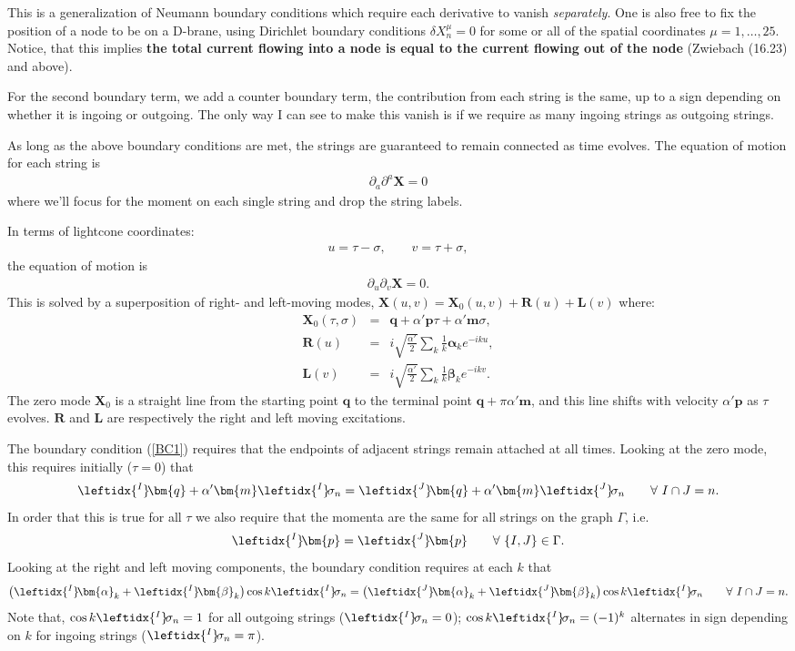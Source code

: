 \documentclass{article}
\newcommand{\be}{\begin{eqnarray}}
\newcommand{\ee}{\end{eqnarray}}
\def\X{\bm{X}}
\def\L{\bm{\lambda}}
\def\p{\bm{p}}
\def\q{\bm{q}}
\def\a{\bm{a}}
\def\m{\bm{m}}
\def\b{\bm{b}}
\def\lI{\leftidx{^I} \! }
\def\lJ{\leftidx{^J} \! }
\def\L{\bm{L}}
\def\R{\bm{R}}
\def\a{\bm{\alpha}}
\def\b{\bm{\beta}}
\begin{document}
This is a generalization of Neumann boundary conditions which require each derivative to vanish \textit{separately}. One is also free to fix the position of a node to be on a D-brane, using Dirichlet boundary conditions $\delta X^\mu_n = 0$ for some or all of the spatial coordinates $\mu = 1, \ldots, 25$. Notice, that this implies \textbf{the total current flowing into a node is equal to the current flowing out of the node} (Zwiebach (16.23) and above).

For the second boundary term, we add a counter boundary term, the contribution from each string is the same, up to a sign depending on whether it is ingoing or outgoing. The only way I can see to make this vanish is if we require as many ingoing strings as outgoing strings.

As long as the above boundary conditions are met, the strings are guaranteed to remain connected as time evolves. The equation of motion for each string is
\be
\partial_a \partial^a \X = 0
\ee
where we'll focus for the moment on each single string and drop the string labels.

In terms of lightcone coordinates:
\be
u = \tau - \sigma, \qquad v = \tau + \sigma,
\ee
the equation of motion is
\be
\partial_u \partial_v \X = 0.
\ee
This is solved by a superposition of right- and left-moving modes, $\X(u,v) = \X_0(u,v) + \R(u) + \L(v)$ where:
\be
\X_0(\tau, \sigma) &=& \q + \alpha' \p \tau + \alpha' \m \sigma, \\[3pt]
\R(u) &=& i \sqrt{\frac{\alpha'}{2}} \sum_k \frac{1}{k} \a_k e^{-iku}, \\
\L(v) &=& i \sqrt{\frac{\alpha'}{2}} \sum_k \frac{1}{k} \b_k e^{-ikv}.
\ee
The zero mode $\X_0$ is a straight line from the starting point $\q$ to the terminal point $\q + \pi \alpha' \m $, and this line shifts with velocity $\alpha' \p$ as $\tau$ evolves. $\R$ and $\L$ are respectively the right and left moving excitations.

The boundary condition (\ref{BC1}) requires that the endpoints of adjacent strings remain attached at all times. Looking at the zero mode, this requires initially ($\tau = 0$) that
\be
\lI \q + \alpha' \m \lI \sigma_n = \lJ \q + \alpha' \m \lJ \sigma_n \qquad \forall \ I \cap J = n .
\ee
In order that this is true for all $\tau$ we also require that the momenta are the same for all strings on the graph $\Gamma$, i.e. 
\be
\lI \p = \lJ \p \qquad \forall \ \{I, J\} \in \Gamma.
\ee
Looking at the right and left moving components, the boundary condition requires at each $k$ that
\be
\left( \lI \a_k + \lI \b_k \right) \cos k \lI \sigma_n = \left( \lJ \a_k  + \lJ \b_k \right) \cos k \lI \sigma_n \qquad \forall \ I \cap J = n.
\ee
Note that, $\cos k \lI \sigma_n = 1$ for all outgoing strings ($\lI \sigma_n = 0$); $\cos k \lI \sigma_n = (-1)^k$ alternates in sign depending on $k$ for ingoing strings ($\lI \sigma_n = \pi$).
\end{document}
